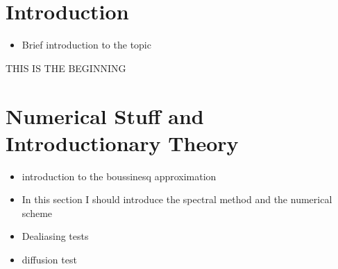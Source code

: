 \documentclass[letterpaper,12pt,titlepage,oneside,final]{book}
\begin{document}
%

\chapter{Introduction}
\begin{itemize}
	\item Brief introduction to the topic
\end{itemize}
THIS IS THE BEGINNING



%
%
\chapter{Numerical Stuff and Introductionary Theory}
\begin{itemize}
\item introduction to the boussinesq approximation 
\item In this section I should introduce the spectral method and the numerical scheme
\item Dealiasing tests 
\item  diffusion test
\end{itemize}
\end{document}
